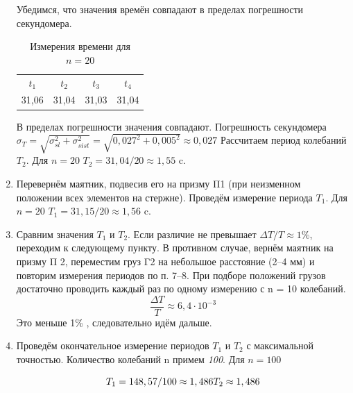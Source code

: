 \documentclass[a4paper, 12pt]{article}
\begin{document}
\begin{enumerate}
    Убедимся, что значения времён совпадают в пределах погрешности секундомера. \newline
    \begin{table}
        \centering
        \begin{tabular}{|c|c|c|c|}
        \hline
           $t_1$  & $t_2$ & $t_3$ & $t_4$ \\
           31,06  & 31,04 & 31,03 & 31,04\\
        \hline
        \end{tabular}
        \caption{Измерения времени для $n=20$}
        \label{tt}
    \end{table}
    В пределах погрешности значения совпадают. Погрешность секундомера\newline
    $\sigma_T = \sqrt{\sigma_{sl}^2+\sigma_{sist}^2} = \sqrt{0,027^2 + 0,005^2} \approx 0,027$    \newline
    Рассчитаем период колебаний $T_2$.\newline
    Для $n=20$ $T_2 = 31,04/20 \approx 1,55$ c.    
    \item Перевернём маятник, подвесив его на призму Π1 (при неизменном положении всех элементов на стержне). Проведём измерение периода $T_1$.\newline
    Для $n=20$ $T_1 = 31,15/20 \approx 1,56$ c.
    \item Сравним значения $T_1$ и $T_2$. Если различие не превышает $\Delta{T}/T \approx 1\%$, переходим к следующему пункту.\newline
    В противном случае, вернём маятник на призму Π 2, переместим груз Γ2 на небольшое расстояние (2–4 мм) и повторим измерения периодов по п. 7–8. При подборе положений грузов достаточно проводить каждый раз по одному измерению с n = 10 колебаний.\newline
    \[
    \frac{\Delta{T}}{T} \approx 6,4\cdot10^{-3}
    \]
    Это меньше 1\% , следовательно идём дальше.    
    \item Проведём окончательное измерение периодов $T_1$ и $T_2$ с максимальной точностью. Количество колебаний n примем \textit{100}. \newline
    Для $n=100$ 
    \begin{center}
    \begin{equation*}
        T_1=148,57/100 \approx 1,486\\
        T_2 \approx 1,486 \\
    \end{equation*} 
    \end{center}
           

\end{enumerate}
\end{document}

